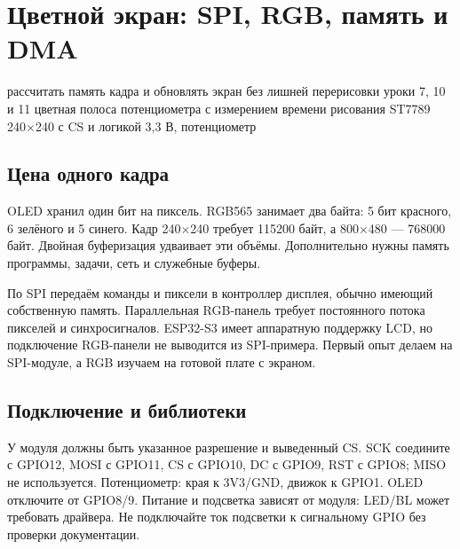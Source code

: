 \section{Цветной экран: SPI, RGB, память и DMA}\label{les:lcd}
\lessonintro
  {рассчитать память кадра и обновлять экран без лишней перерисовки}
  {уроки 7, 10 и 11}
  {цветная полоса потенциометра с измерением времени рисования}
  {ST7789 240×240 с CS и логикой 3,3 В, потенциометр}

\subsection{Цена одного кадра}
OLED хранил один бит на пиксель. RGB565 занимает два байта: 5 бит красного, 6 зелёного и 5 синего.
Кадр 240×240 требует 115200 байт, а 800×480 --- 768000 байт. Двойная буферизация удваивает
эти объёмы. Дополнительно нужны память программы, задачи, сеть и служебные буферы.

По SPI передаём команды и пиксели в контроллер дисплея, обычно имеющий собственную память.
Параллельная RGB-панель требует постоянного потока пикселей и синхросигналов. ESP32-S3 имеет
аппаратную поддержку LCD, но подключение RGB-панели не выводится из SPI-примера.
Первый опыт делаем на SPI-модуле, а RGB изучаем на готовой плате с экраном.

\subsection{Подключение и библиотеки}
У модуля должны быть указанное разрешение и выведенный CS. SCK соедините с GPIO12,
MOSI с GPIO11, CS с GPIO10, DC с GPIO9, RST с GPIO8; MISO не используется.
Потенциометр: края к 3V3/GND, движок к GPIO1. OLED отключите от GPIO8/9.
Питание и подсветка зависят от модуля: LED/BL может требовать драйвера.
Не подключайте ток подсветки к сигнальному GPIO без проверки документации.

